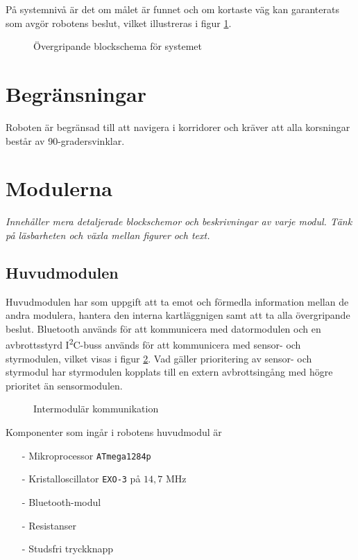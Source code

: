 \documentclass[11pt]{article}
\begin{document}
\begin{flushleft}
På systemnivå är det om målet är funnet och om kortaste väg kan garanterats som avgör robotens beslut, vilket illustreras i figur \ref{blockSystem}.

\begin{figure}[htbp]
\centering
\noindent\resizebox{1\linewidth}{!}{
	}
	\caption{Övergripande blockschema för systemet}	\label{blockSystem}
\end{figure}

\section{Begränsningar}
Roboten är begränsad till att navigera i korridorer och kräver att alla korsningar består av 90-gradersvinklar.

\section{Modulerna}
\textit{Innehåller mera detaljerade blockschemor och beskrivningar av varje modul. Tänk på läsbarheten och växla mellan figurer och text.}

\subsection{Huvudmodulen}
Huvudmodulen har som uppgift att ta emot och förmedla information mellan de andra modulera, hantera den interna kartläggnigen samt att ta alla övergripande beslut. Bluetooth\textsuperscript{\circledR} används för att kommunicera med datormodulen och en avbrottsstyrd I\textsuperscript{2}C-buss används för att kommunicera med sensor- och styrmodulen, vilket visas i figur \ref{communication}. Vad gäller prioritering av sensor- och styrmodul har styrmodulen kopplats till en extern avbrottsingång med högre prioritet än sensormodulen.

\begin{figure}[htbp]
\noindent\resizebox{.97\textwidth}{!}{
	}
	\caption{Intermodulär kommunikation \label{communication}}
\end{figure}

Komponenter som ingår i robotens huvudmodul är 
\begin{itemize}
  \item[-] Mikroprocessor \verb+ATmega1284p+
  \item[-] Kristalloscillator \verb+EXO-3+ på $14,7$ MHz
  \item[-] Bluetooth\textsuperscript{\circledR}-modul
  \item[-] Resistanser
  \item[-] Studsfri tryckknapp
\end{itemize}


\end{flushleft}
\end{document}
